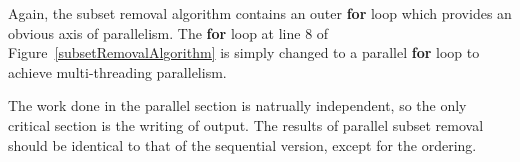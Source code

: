 
Again, the subset removal algorithm contains an outer \textbf{for}
loop which provides an obvious axis of parallelism.  The \textbf{for}
loop at line 8 of Figure~\ref{subsetRemovalAlgorithm} is simply
changed to a parallel \textbf{for} loop to achieve multi-threading
parallelism.  

The work done in the parallel section is natrually independent, so the
only critical section is the writing of output.  The results of
parallel subset removal should be identical to that of the sequential
version, except for the ordering.


